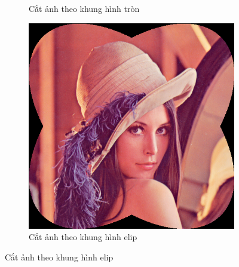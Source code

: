 \documentclass[]{article}
\begin{document}
\begin{figure}[!ht]
\begin{subfigure}[b]{0.3\linewidth}
    \caption{Cắt ảnh theo khung hình tròn}
  \end{subfigure}
  \begin{subfigure}[b]{0.3\linewidth}
    \includegraphics[width=\linewidth]{image/Lenna_elliptical_crop.png}
    \caption{Cắt ảnh theo khung hình elip}
  \end{subfigure}
\end{figure}
\newpage
\end{document}
